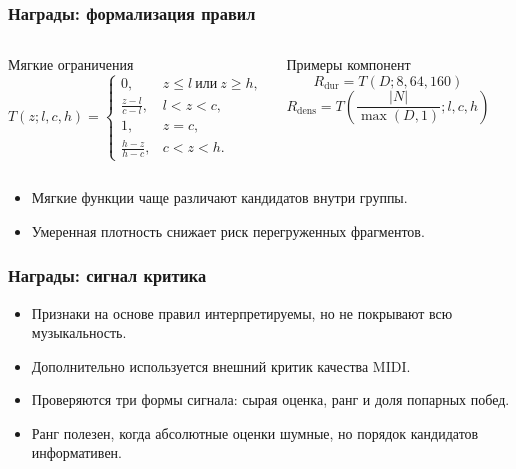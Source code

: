 \documentclass[aspectratio=169]{beamer}
\begin{document}
\begin{frame}
\frametitle{Награды: формализация правил}
\small
\begin{columns}[T,totalwidth=\textwidth]
\begin{block}{Мягкие ограничения}
\[
T(z;l,c,h)=
\begin{cases}
0, & z\le l \ \text{или}\ z\ge h,\\
\frac{z-l}{c-l}, & l<z<c,\\
1, & z=c,\\
\frac{h-z}{h-c}, & c<z<h.
\end{cases}
\]
\end{block}

\begin{block}{Примеры компонент}
\[
R_{\mathrm{dur}}=T(D;8,64,160)
\]
\[
R_{\mathrm{dens}}=T\left(\frac{|N|}{\max(D,1)};l,c,h\right)
\]
\end{block}
\end{columns}

\medskip
\begin{itemize}
    \item Мягкие функции чаще различают кандидатов внутри группы.
    \item Умеренная плотность снижает риск перегруженных фрагментов.
\end{itemize}
\end{frame}

\begin{frame}
\frametitle{Награды: сигнал критика}
\begin{itemize}
    \item Признаки на основе правил интерпретируемы, но не покрывают всю музыкальность.
    \item Дополнительно используется внешний критик качества MIDI.
    \item Проверяются три формы сигнала: сырая оценка, ранг и доля попарных побед.
    \item Ранг полезен, когда абсолютные оценки шумные, но порядок кандидатов информативен.
\end{itemize}
\end{frame}
\end{document}
